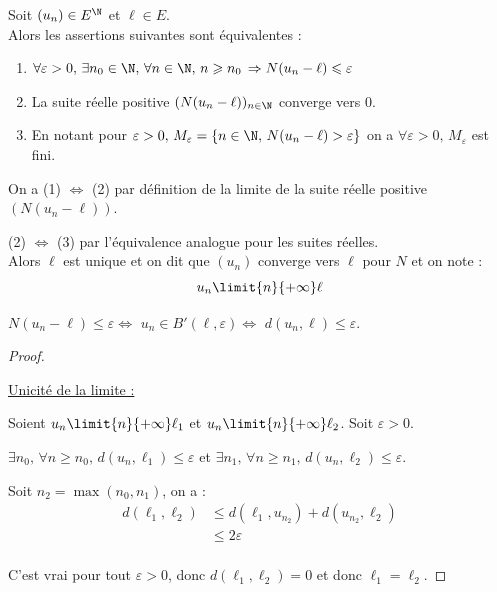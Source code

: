 \begin{definition}{}{}
    Soit $(u_n) \in E^{\N}$ et $\ell \in E$. \\

    Alors les assertions suivantes sont équivalentes : 
    \begin{enumerate}
        \item $\forall \varepsilon > 0, \, \exists n_0 \in \N, \, \forall n \in \N, \, n \geqslant n_0 \, \Rightarrow N(u_n - \ell) \leqslant \varepsilon$
        \item La suite réelle positive $(N(u_n - \ell))_{n \in \N}$ converge vers 0.
        \item En notant pour $\varepsilon > 0, \, M_\varepsilon = \{n \in \N, \, N(u_n - \ell) > \varepsilon\}$ on a
            $\forall \varepsilon > 0, \, M_\varepsilon$ est fini. \\
    \end{enumerate}

    On a (1) $\iff$ (2) par définition de la limite de la suite réelle positive $(N(u_n - \ell))$.

    (2) $\iff$ (3) par l'équivalence analogue pour les suites réelles.\\

    Alors $\ell$ est unique et on dit que $(u_n)$ converge vers $\ell$ pour $N$ et on note :
    \[u_n \limit{n}{+\infty} \ell\]
\end{definition}

\begin{remarque}
    $N(u_n - \ell) \leqslant \varepsilon \iff$ $u_n \in B'(\ell, \varepsilon) \iff$ $d(u_n, \ell) \leqslant \varepsilon$.
\end{remarque}


\begin{proof}~

    \uline{Unicité de la limite :}

    \avspace Soient $u_n \limit{n}{+\infty} \ell_1$ et $u_n \limit{n}{+\infty} \ell_2$.
    Soit $\varepsilon > 0$. 

    $\exists n_0, \, \forall n \geqslant n_0, \, d(u_n, \ell_1) \leqslant \varepsilon$ et
    $\exists n_1, \, \forall n \geqslant n_1, \, d(u_n, \ell_2) \leqslant \varepsilon$.

    Soit $n_2 = \max(n_0, n_1)$, on a :
    \begin{align*}
        d(\ell_1, \ell_2) & \leqslant d(\ell_1, u_{n_2}) + d(u_{n_2}, \ell_2) \\
        &\leqslant 2\varepsilon \\
    \end{align*}

    C'est vrai pour tout $\varepsilon > 0$, donc $d(\ell_1, \ell_2) = 0$ et donc $\ell_1 = \ell_2$.
\end{proof}

